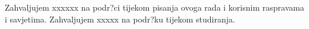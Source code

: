 \vspace{5pt}

\begin{flushleft}
\noindent Zahvaljujem xxxxxx na podr?ci tijekom pisanja ovoga rada i korisnim raspravama i savjetima. Zahvaljujem xxxxx na podr?ku tijekom studiranja.
\end{flushleft}